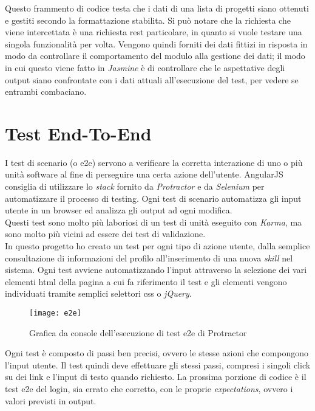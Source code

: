 Questo frammento di codice testa che i dati di una lista di progetti siano ottenuti e gestiti secondo la formattazione stabilita. Si può notare che la richiesta che viene intercettata è una richiesta \gls{rest} particolare, in quanto si vuole testare una singola funzionalità per volta. Vengono quindi forniti dei dati fittizi in risposta in modo da controllare il comportamento del modulo alla gestione dei dati; il modo in cui questo viene fatto in \emph{Jasmine} è di controllare che le aspettative degli output siano confrontate con i dati attuali all'esecuzione del test, per vedere se entrambi combaciano.


\newpage

\section{Test End-To-End}
I test di scenario (o \gls{e2e}) servono a verificare la corretta interazione di uno o più unità software al fine di perseguire una certa azione dell'utente. AngularJS consiglia di utilizzare lo \emph{stack} fornito da \emph{Protractor} e da \emph{Selenium} per automatizzare il processo di testing. Ogni test di scenario automatizza gli input utente in un browser ed analizza gli output ad ogni modifica.\\
Questi test sono molto più laboriosi di un test di unità eseguito con \emph{Karma}, ma sono molto più vicini ad essere dei test di validazione.\\
In questo progetto ho creato un test per ogni tipo di azione utente, dalla semplice consultazione di informazioni del profilo all'inserimento di una nuova \emph{skill} nel sistema. Ogni test avviene automatizzando l'input attraverso la selezione dei vari elementi \gls{html} della pagina a cui fa riferimento il test e gli elementi vengono individuati tramite semplici selettori \gls{css} o \emph{jQuery}.\\

\begin{figure}[!h] 
    \centering 
    \texttt{[image: e2e]} 
    \caption{Grafica da console dell'esecuzione di test \gls{e2e} di Protractor}
\end{figure}

Ogni test è composto di passi ben precisi, ovvero le stesse azioni che compongono l'input utente. Il test quindi deve effettuare gli stessi passi, compresi i singoli click su dei link e l'input di testo quando richiesto. La prossima porzione di codice è il test \gls{e2e} del login, sia errato che corretto, con le proprie \emph{expectations}, ovvero i valori previsti in output.

